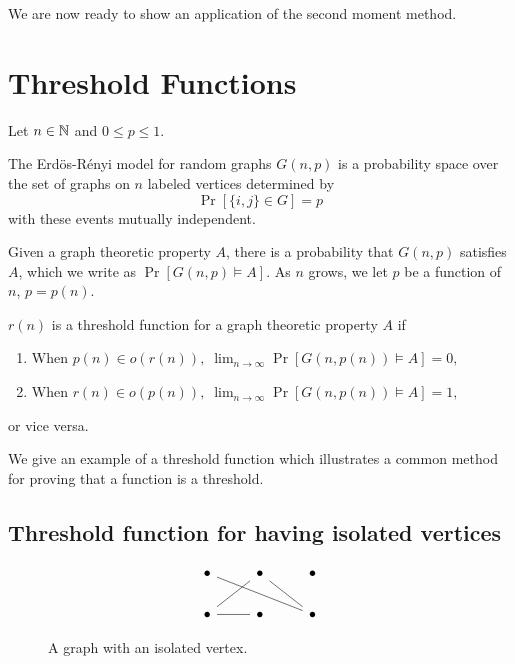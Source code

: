 We are now ready to show an application of the second moment method. \par
\section{Threshold Functions}\label{sec:probmet:threshold}

Let $n \in \mathbb{N}$ and $0 \leq p \leq 1$. 
\begin{definition}
    The Erdös-Rényi model for random graphs $G(n, p)$ is a probability space over the set of graphs on $n$ labeled vertices determined by
    \[\Pr[\{i, j\} \in G] = p\] 
    with these events mutually independent.
\end{definition}
 Given a graph theoretic property $A$, there is a probability that $G(n, p)$ satisfies $A$, which we write as $\Pr[G(n, p) \vDash A]$. As $n$ grows, we let $p$ be a function of $n$, $p = p(n)$. \par

\begin{definition}\label{def:probmet:threshold}
    $r(n)$ is a threshold function for a graph theoretic property $A$ if 
    \begin{enumerate}
        \item When \(p(n) \in o(r(n)), \; \lim_{n \to \infty} \Pr[G(n, p(n)) \vDash A] = 0,\)
        \item When \(r(n) \in o(p(n)), \;  \lim_{n \to \infty} \Pr[G(n, p(n)) \vDash A] = 1,\) 
    \end{enumerate}
    or vice versa.
\end{definition}

We give an example of a threshold function which illustrates a common method for proving that a function is a threshold. \par

\subsection{Threshold function for having isolated vertices}

\begin{figure}[h]
    \[\begin{tikzcd}
        \bullet & \bullet & \bullet \\
        \bullet & \bullet & \bullet
        \arrow[no head, from=2-1, to=1-2]
        \arrow[no head, from=2-1, to=2-2]
        \arrow[no head, from=1-2, to=2-3]
        \arrow[no head, from=2-3, to=1-1]
    \end{tikzcd}\]
    \caption{A graph with an isolated vertex.}
    \label{fig:isolatedvertex}
\end{figure}

